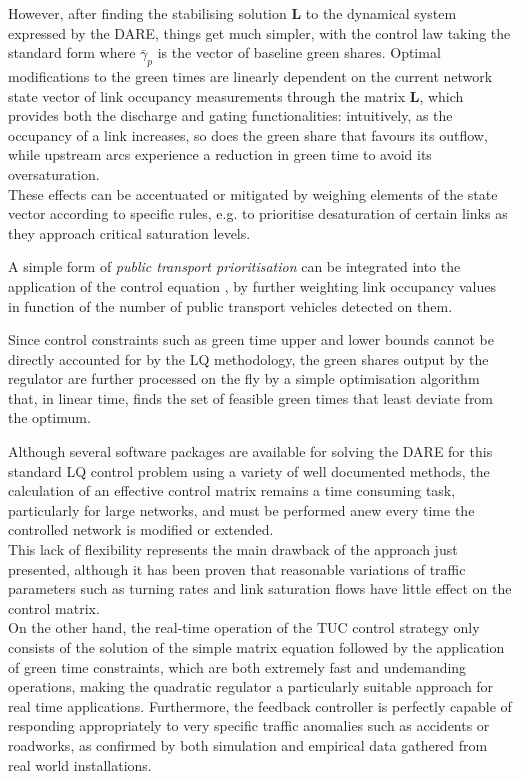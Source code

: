 However, after finding the stabilising solution $\mathbf{L}$ to the dynamical system expressed by
the DARE, things get much simpler, with the control law taking the standard form
where $\bar{\gamma}_{p}$ is the vector of baseline green shares. Optimal modifications to the green times are linearly dependent on the current network state vector of link occupancy measurements through the matrix $\mathbf{L}$, which provides both the discharge and gating functionalities: intuitively, as the occupancy of a link increases, so does the green share that favours its outflow, while upstream arcs experience a reduction in green time to avoid its oversaturation.\\
These effects can be accentuated or mitigated by weighing elements of the state vector
according to specific rules, e.g. to prioritise desaturation of certain links as they approach
critical saturation levels.

A simple form of \emph{public transport prioritisation} can be integrated into the
application of the control equation , by further weighting link occupancy values in
function of the number of public transport vehicles detected on them.

Since control constraints such as green time upper and lower bounds cannot be directly
accounted for by the LQ methodology, the green shares output by the regulator are further
processed on the fly by a simple optimisation algorithm that, in linear time, finds the set of
feasible green times that least deviate from the optimum. 

Although several software packages are available for solving the DARE for this standard
LQ control problem using a variety of well documented methods, the calculation of an
effective control matrix remains a time consuming task, particularly for large networks, and
must be performed anew every time the controlled network is modified or extended.\\
This lack of flexibility represents the main drawback of the approach just presented,
although it has been proven that reasonable variations of traffic parameters such as turning
rates and link saturation flows have little effect on the control matrix.\\
On the other hand, the real-time operation of the TUC control strategy only consists of
the solution of the simple matrix equation  followed by the application of green time
constraints, which are both extremely fast and undemanding operations, making the quadratic
regulator a particularly suitable approach for real time applications. Furthermore, the
feedback controller is perfectly capable of responding appropriately to very specific traffic
anomalies such as accidents or roadworks, as confirmed by both simulation and empirical
data gathered from real world installations.

